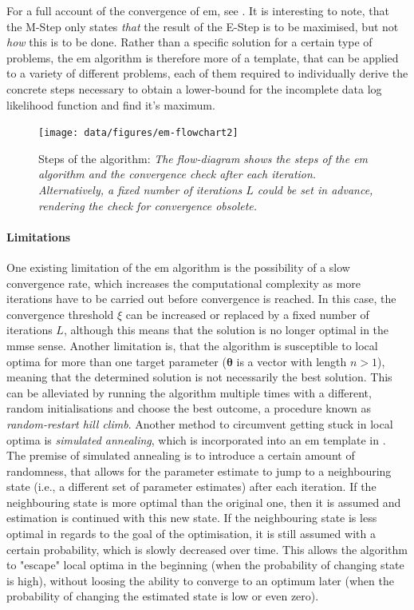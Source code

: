 For a full account of the convergence of \gls{em}, see \cite{Wu1983}. It is interesting to note, that the M-Step only states \textit{that} the result of the E-Step is to be maximised, but not \textit{how} this is to be done. Rather than a specific solution for a certain type of problems, the \gls{em} algorithm is therefore more of a template, that can be applied to a variety of different problems, each of them required to individually derive the concrete steps necessary to obtain a lower-bound for the incomplete data log likelihood function and find it's maximum.

\begin{figure}
\centering
\texttt{[image: data/figures/em-flowchart2]}
\caption[Steps of the  algorithm]{Steps of the  algorithm: \itshape The flow-diagram shows the steps of the \gls{em} algorithm and the convergence check after each iteration. Alternatively, a fixed number of iterations $L$ could be set in advance, rendering the check for convergence obsolete.}
\end{figure}

\paragraph{Limitations}
One existing limitation of the \gls{em} algorithm is the possibility of a slow convergence rate, which increases the computational complexity as more iterations have to be carried out before convergence is reached. In this case, the convergence threshold $\xi$ can be increased or replaced by a fixed number of iterations $L$, although this means that the solution is no longer optimal in the \gls{mmse} sense. Another limitation is, that the algorithm is susceptible to local optima for more than one target parameter ($\bm\theta$ is a vector with length $n>1$), meaning that the determined solution is not necessarily the best solution. This can be alleviated by running the algorithm multiple times with a different, random initialisations and choose the best outcome, a procedure known as \textit{random-restart hill climb}. Another method to circumvent getting stuck in local optima is \textit{simulated annealing}, which is incorporated into an \gls{em} template in \cite{Guo2007}. The premise of simulated annealing is to introduce a certain amount of randomness, that allows for the parameter estimate to jump to a neighbouring state (i.e., a different set of parameter estimates) after each iteration. If the neighbouring state is more optimal than the original one, then it is assumed and estimation is continued with this new state. If the neighbouring state is less optimal in regards to the goal of the optimisation, it is still assumed with a certain probability, which is slowly decreased over time. This allows the algorithm to "escape" local optima in the beginning (when the probability of changing state is high), without loosing the ability to converge to an optimum later (when the probability of changing the estimated state is low or even zero).

